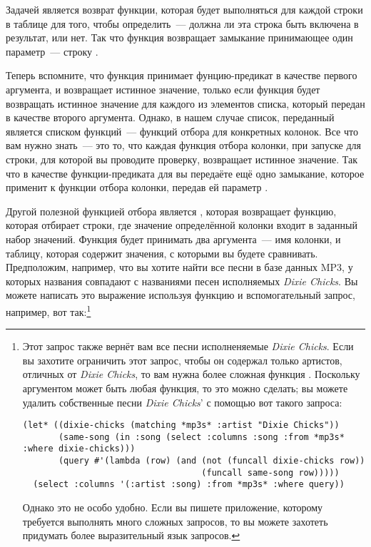 Задачей  является возврат функции, которая будет выполняться для каждой
строки в таблице для того, чтобы определить~--- должна ли эта строка быть включена в
результат, или нет.  Так что функция  возвращает замыкание принимающее один
параметр~--- строку .

Теперь вспомните, что функция  принимает фунцию-предикат в качестве первого
аргумента, и возвращает истинное значение, только если функция будет возвращать истинное
значение для каждого из элементов списка, который передан  в качестве второго
аргумента.  Однако, в нашем случае список, переданный  является списком
функций~--- функций отбора для конкретных колонок.  Все что вам нужно знать~--- это то,
что каждая функция отбора колонки, при запуске для строки, для которой вы проводите
проверку, возвращает истинное значение.  Так что в качестве функции-предиката для
 вы передаёте ещё одно замыкание, которое применит  к функции
отбора колонки, передав ей параметр .

Другой полезной функцией отбора является , которая возвращает функцию, которая
отбирает строки, где значение определённой колонки входит в заданный набор значений.
Функция  будет принимать два аргумента~--- имя колонки, и таблицу, которая
содержит значения, с которыми вы будете сравнивать.  Предположим, например, что вы хотите
найти все песни в базе данных MP3, у которых названия совпадают с названиями песен
исполняемых \textit{Dixie Chicks}.  Вы можете написать это выражение 
используя функцию  и вспомогательный запрос, например, вот так:\footnote{Этот
  запрос также вернёт вам все песни исполненяемые \textit{Dixie Chicks}.  Если вы захотите
  ограничить этот запрос, чтобы он содержал только артистов, отличных от \textit{Dixie
    Chicks}, то вам нужна более сложная функция .  Поскольку аргументом
   может быть любая функция, то это можно сделать; вы можете удалить
  собственные песни \textit{Dixie Chicks}' с помощью вот такого запроса:

\begin{lstlisting}
(let* ((dixie-chicks (matching *mp3s* :artist "Dixie Chicks"))
       (same-song (in :song (select :columns :song :from *mp3s* :where dixie-chicks)))
       (query #'(lambda (row) (and (not (funcall dixie-chicks row)) 
                                   (funcall same-song row)))))
  (select :columns '(:artist :song) :from *mp3s* :where query))
\end{lstlisting}

Однако это не особо удобно.  Если вы пишете приложение, которому требуется выполнять много
сложных запросов, то вы можете захотеть придумать более выразительный язык запросов.}

